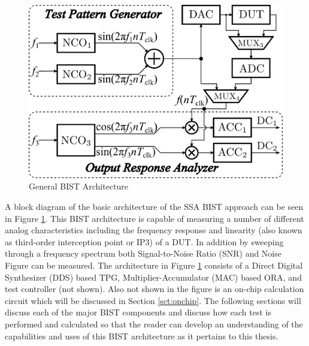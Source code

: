 \documentclass[12pt]{report}
\begin{document}
\begin{figure}
	\begin{center}
		\includegraphics[scale=.5]{images/bist-ssa-architecture}
	\end{center}
	\caption{General BIST Architecture\cite{testtime}}
	\label{fig:bist-ssa}
\end{figure}
A block diagram of the basic architecture of the SSA BIST approach can be seen in Figure \ref{fig:bist-ssa}.  This BIST architecture is capable of measuring a number of different analog characteristics including the frequency response and linearity (also known as third-order interception point or IP3) of a DUT\cite{basessa}.  In addition by sweeping through a frequency spectrum both Signal-to-Noise Ratio (SNR) and Noise Figure\cite{noisefigure} can be measured.  The architecture in Figure \ref{fig:bist-ssa} consists of a Direct Digital Synthesizer (DDS) based TPG, Multiplier-Accumulator (MAC) based ORA, and test controller (not shown).  Also not shown in the figure is an on-chip calculation circuit which will be discussed in Section \ref{sct:onchip}.  The following sections will discuss each of the major BIST components and discuss how each test is performed and calculated so that the reader can develop an understanding of the capabilities and uses of this BIST architecture as it pertains to this thesis.
\end{document}

